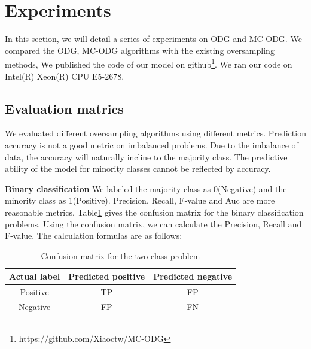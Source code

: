 \documentclass[ida]{iosart2x}
\begin{document}
\section{Experiments}

In this section, we will detail a series of experiments on ODG and MC-ODG.
We compared the ODG, MC-ODG algorithms with the existing oversampling methods,
We published the code of our model on github\footnote{https://github.com/Xiaoctw/MC-ODG}.
We ran our code on Intel(R) Xeon(R) CPU E5-2678.
\subsection{Evaluation matrics}

We evaluated different oversampling algorithms using different metrics. 
Prediction accuracy is not a good metric on imbalanced problems.
Due to the imbalance of data, the accuracy will naturally incline to the majority class.
The predictive ability of the model for minority classes cannot be reflected by accuracy.

\textbf{Binary classification} We labeled the majority class as 0(Negative) and the minority class as 1(Positive).
Precision, Recall, F-value and Auc are more reasonable metrics.
Table\ref{table1} gives the confusion matrix for the binary classification problems.
Using the confusion matrix, 
  we can calculate the Precision, Recall and F-value. The calculation formulas are as follows:

\begin{table}[tb]
  \caption{Confusion matrix for the two-class problem}
  \label{table1}
  \centering
  \begin{tabular}{@{}ccc@{}}
  \toprule
  Actual label & \multicolumn{1}{l}{Predicted positive} & \multicolumn{1}{l}{Predicted negative} \\ \midrule
  Positive     & TP                                     & FP                                     \\
  Negative     & FP                                     & FN                                     \\ \bottomrule
  \end{tabular}
\end{table}
\end{document}
